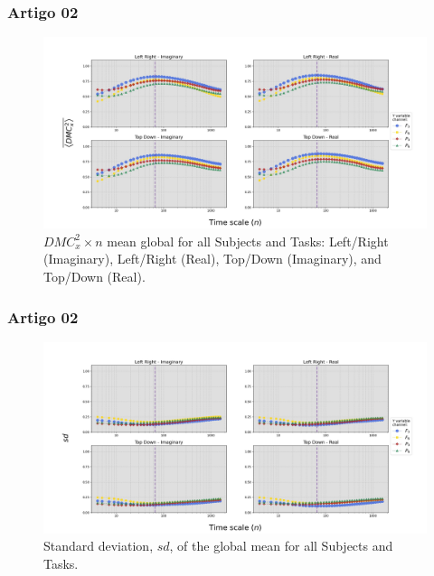 \documentclass[11pt, aspectratio=169]{beamer}
\begin{document}
\begin{frame}
  \frametitle{Artigo 02}

  \begin{figure}[!h]
    \includegraphics[height=.5\paperheight]{../Figures/art_02/Fig8.jpg}
    \caption{$DMC_{x}^{2} \times n$ mean global for all Subjects and Tasks: Left/Right (Imaginary), Left/Right (Real), Top/Down (Imaginary), and Top/Down (Real).}
    \label{fig08}
  \end{figure}
\end{frame}


\begin{frame}
  \frametitle{Artigo 02}

  \begin{figure}[!h]
    \includegraphics[height=.5\paperheight]{../Figures/art_02/Fig9.jpg}
    \caption{Standard deviation, $sd$, of the global mean for all Subjects and Tasks.}
    \label{fig09}
  \end{figure}
\end{frame}
\end{document}
